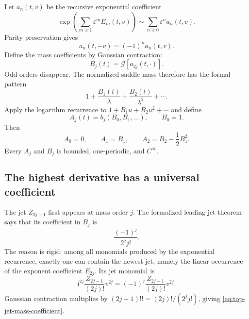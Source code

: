 \documentclass[11pt,oneside]{article}
\theoremstyle{definition}
\theoremstyle{remark}
\newcommand{\ii}{\mathrm i}
\newcommand{\Gcal}{\mathcal G}
\begin{document}
Let $a_n(t,v)$ be the recursive exponential coefficient
\begin{equation}
 \exp\!\left(\sum_{m\ge1}\varepsilon^mE_m(t,v)\right)
 \sim\sum_{n\ge0}\varepsilon^na_n(t,v).
 \label{eq:saddle-exp-formal}
\end{equation}
Parity preservation gives
\begin{equation}
 a_n(t,-v)=(-1)^na_n(t,v).
 \label{eq:saddle-a-parity}
\end{equation}
Define the mass coefficients by Gaussian contraction:
\begin{equation}
 B_j(t)=\Gcal[a_{2j}(t,\cdot)].
 \label{eq:saddle-mass-coefficient}
\end{equation}
Odd orders disappear.  The normalized saddle mass therefore has the formal pattern
\begin{equation}
 1+\frac{B_1(t)}{\lambda}
   +\frac{B_2(t)}{\lambda^2}+\cdots.
 \label{eq:saddle-mass-pattern}
\end{equation}
Apply the logarithm recurrence to $1+B_1u+B_2u^2+\cdots$ and define
\begin{equation}
 A_j(t)=b_j(B_0,B_1,\ldots),
 \qquad B_0=1.
 \label{eq:saddle-log-coefficient}
\end{equation}
Then
\begin{equation}
 A_0=0,
 \qquad
 A_1=B_1,
 \qquad
 A_2=B_2-\frac12B_1^2.
 \label{eq:first-log-mass-relations}
\end{equation}
Every $A_j$ and $B_j$ is bounded, one-periodic, and $C^\infty$.

\subsection{The highest derivative has a universal coefficient}

The jet $Z_{2j-1}$ first appears at mass order $j$.  The formalized leading-jet theorem says
that its coefficient in $B_j$ is
\begin{equation}
 \frac{(-1)^j}{2^jj!}.
 \label{eq:top-jet-mass-coefficient}
\end{equation}
The reason is rigid: among all monomials produced by the exponential recurrence, exactly one
can contain the newest jet, namely the linear occurrence of the exponent coefficient
$E_{2j}$.  Its jet monomial is
\begin{equation}
 \ii^{2j}\frac{Z_{2j-1}}{(2j)!}v^{2j}
 =(-1)^j\frac{Z_{2j-1}}{(2j)!}v^{2j}.
 \label{eq:top-jet-monomial}
\end{equation}
Gaussian contraction multiplies by $(2j-1)!!=(2j)!/(2^jj!)$, giving
\eqref{eq:top-jet-mass-coefficient}.
\end{document}
